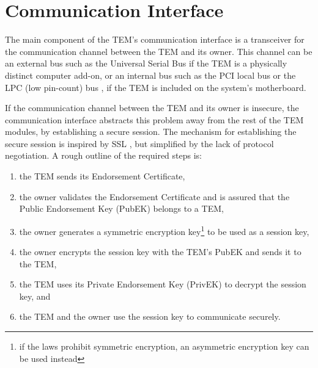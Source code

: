 \section{Communication Interface}\label{arch:interface}
The main component of the TEM's communication interface is a transceiver for
the communication channel between the TEM and its owner. This channel can be an
external bus such as the Universal Serial Bus \cite{specification2000r} if
the TEM is a physically distinct computer add-on, or an internal bus such as
the PCI local bus \cite{specification1998r} or the LPC (low pin-count) bus
\cite{intel2002lpc}, if the TEM is included on the system's motherboard.

If the communication channel between the TEM and its owner is insecure, the
communication interface abstracts this problem away from the rest of the TEM
modules, by establishing a secure session. The mechanism for establishing the
secure session is inspired by SSL \cite{freier1996ssl}, but simplified by the
lack of protocol negotiation. A rough outline of the required steps is:
\begin{enumerate}
  \item the TEM sends its Endorsement Certificate,
  \item the owner validates the Endorsement Certificate and is assured that the
  Public Endorsement Key (PubEK) belongs to a TEM,
  \item the owner generates a symmetric encryption key\footnote{if the laws prohibit symmetric
  encryption, an asymmetric encryption key can be used instead} to be used as a
  session key,
  \item the owner encrypts the session key with the TEM's PubEK and sends it to
  the TEM,
  \item the TEM uses its Private Endorsement Key (PrivEK) to decrypt the
  session key, and
  \item the TEM and the owner use the session key to communicate securely.
\end{enumerate}

